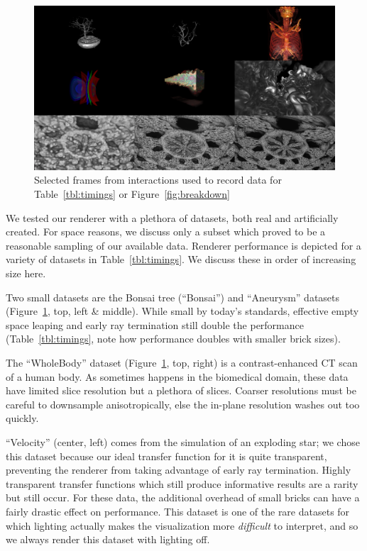 \begin{figure}
  \centering
  \includegraphics[width=0.98\linewidth]{images/rg/perFramesSmall.png}
  \caption{Selected frames from interactions used to record data for
  Table~\ref{tbl:timings} or Figure~\ref{fig:breakdown}}
  \label{fig:perFrames}
\end{figure}

We tested our renderer with a plethora of datasets, both real and
artificially created.  For space reasons, we discuss only a subset which
proved to be a reasonable sampling of our available data.
Renderer performance is depicted for a variety of datasets in
Table~\ref{tbl:timings}.  We discuss these in order of increasing size
here.

Two small datasets are the Bonsai tree (``Bonsai'') and ``Aneurysm''
datasets (Figure~\ref{fig:perFrames}, top, left \& middle). While
small by today's standards, effective empty space leaping and early ray
termination still double the performance
(Table~\ref{tbl:timings}, note how performance doubles with smaller
brick sizes).

The ``WholeBody'' dataset (Figure~\ref{fig:perFrames}, top, right) is
a contrast-enhanced CT scan of a human body.  As sometimes happens in
the biomedical domain, these data have limited slice resolution but a
plethora of slices.  Coarser resolutions must be careful to downsample
anisotropically, else the in-plane resolution washes out too quickly.

``Velocity'' (center, left) comes from the simulation of an exploding
star; we chose this dataset because our ideal transfer function for it
is quite transparent, preventing the renderer from taking advantage of
early ray termination.  Highly transparent transfer functions which
still produce informative results are a rarity but still occur.  For
these data, the additional overhead of small bricks can have a fairly
drastic effect on performance.  This dataset is one of the rare datasets
for which lighting actually makes the visualization more
\emph{difficult} to interpret, and so we always render this dataset
with lighting off.

